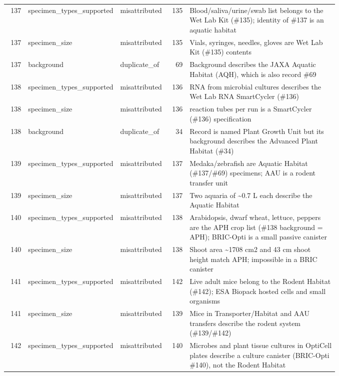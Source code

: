 \begin{longtable}{r>{\raggedright\arraybackslash}p{0.2\linewidth}>{\raggedright\arraybackslash}p{0.12\linewidth}r>{\raggedright\arraybackslash}p{0.45\linewidth}}
137 & specimen\_\allowbreak{}types\_\allowbreak{}supported & misattributed & 135 & Blood/saliva/urine/swab list belongs to the Wet Lab Kit (\#135); identity of \#137 is an aquatic habitat \\
137 & specimen\_\allowbreak{}size & misattributed & 135 & Vials, syringes, needles, gloves are Wet Lab Kit (\#135) contents \\
137 & background & duplicate\_\allowbreak{}of & 69 & Background describes the JAXA Aquatic Habitat (AQH), which is also record \#69 \\
138 & specimen\_\allowbreak{}types\_\allowbreak{}supported & misattributed & 136 & RNA from microbial cultures describes the Wet Lab RNA SmartCycler (\#136) \\
138 & specimen\_\allowbreak{}size & misattributed & 136 & 16 reaction tubes per run is a SmartCycler (\#136) specification \\
138 & background & duplicate\_\allowbreak{}of & 34 & Record is named Plant Growth Unit but its background describes the Advanced Plant Habitat (\#34) \\
139 & specimen\_\allowbreak{}types\_\allowbreak{}supported & misattributed & 137 & Medaka/zebrafish are Aquatic Habitat (\#137/\#69) specimens; AAU is a rodent transfer unit \\
139 & specimen\_\allowbreak{}size & misattributed & 137 & Two aquaria of \textasciitilde{}0.7 L each describe the Aquatic Habitat \\
140 & specimen\_\allowbreak{}types\_\allowbreak{}supported & misattributed & 138 & Arabidopsis, dwarf wheat, lettuce, peppers are the APH crop list (\#138 background = APH); BRIC-Opti is a small passive canister \\
140 & specimen\_\allowbreak{}size & misattributed & 138 & Shoot area \textasciitilde{}1708 cm2 and 43 cm shoot height match APH; impossible in a BRIC canister \\
141 & specimen\_\allowbreak{}types\_\allowbreak{}supported & misattributed & 142 & Live adult mice belong to the Rodent Habitat (\#142); ESA Biopack hosted cells and small organisms \\
141 & specimen\_\allowbreak{}size & misattributed & 139 & Mice in Transporter/Habitat and AAU transfers describe the rodent system (\#139/\#142) \\
142 & specimen\_\allowbreak{}types\_\allowbreak{}supported & misattributed & 140 & Microbes and plant tissue cultures in OptiCell plates describe a culture canister (BRIC-Opti \#140), not the Rodent Habitat \\

\end{longtable}
